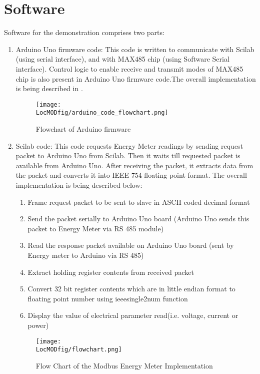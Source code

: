 \section{Software}

Software for the demonstration comprises two parts:

\begin{enumerate}
\item Arduino Uno firmware code:
This code is written to communicate with Scilab (using serial interface), and with MAX485 chip (using Software Serial interface). Control logic to enable receive and transmit modes of MAX485 chip is also present in Arduino Uno firmware code.The overall implementation is being described in .

\begin{figure}
\centering
\texttt{[image: \\LocMODfig/arduino\_code\_flowchart.png]}
\caption{Flowchart of Arduino firmware}
\label{fig:modbus-firmware}
\end{figure}

\item Scilab code:
This code requests Energy Meter readings by sending request packet to Arduino Uno from Scilab. Then it waits till requested packet is available from Arduino Uno. After receiving the packet, it extracts data from the packet and converts it into IEEE 754 floating point format. The overall implementation is being described below:

\begin {enumerate}
\item Frame request packet to be sent to slave in ASCII coded decimal format
\item Send the packet serially to Arduino Uno board (Arduino Uno sends this packet to Energy Meter via RS 485 module)
\item Read the response packet available on Arduino Uno board (sent by Energy meter to Arduino via RS 485)
\item Extract holding register contents from received packet
\item Convert  32 bit register contents which are in little endian format to floating point number using ieeesingle2num function
\item Display the value of electrical parameter read(i.e. voltage, current or power)
\end{enumerate}

\begin{figure}
\centering
\texttt{[image: \\LocMODfig/flowchart.png]}
\caption{Flow Chart of the Modbus Energy Meter Implementation}
\label{fig:flow-chart}
\end{figure}

\end{enumerate}

